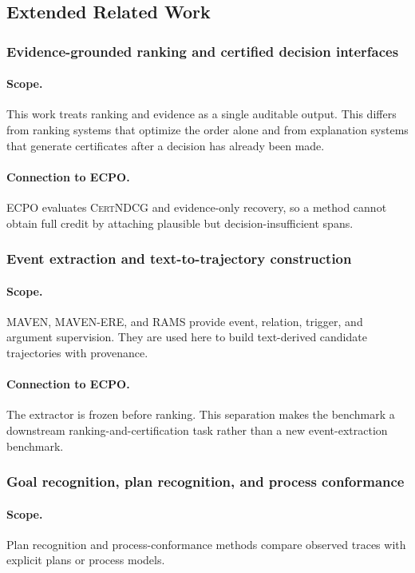 \documentclass{article}
\newcommand{\CertNDCG}{\textsc{CertNDCG}}
\begin{document}
\subsection{Extended Related Work}
\label{sec:app_related_work}

\subsubsection{Evidence-grounded ranking and certified decision interfaces}
\paragraph{Scope.}
This work treats ranking and evidence as a single auditable output. This differs from ranking systems that optimize the order alone and from explanation systems that generate certificates after a decision has already been made.
\paragraph{Connection to ECPO.}
ECPO evaluates \CertNDCG{} and evidence-only recovery, so a method cannot obtain full credit by attaching plausible but decision-insufficient spans.

\subsubsection{Event extraction and text-to-trajectory construction}
\paragraph{Scope.}
MAVEN, MAVEN-ERE, and RAMS provide event, relation, trigger, and argument supervision. They are used here to build text-derived candidate trajectories with provenance.
\paragraph{Connection to ECPO.}
The extractor is frozen before ranking. This separation makes the benchmark a downstream ranking-and-certification task rather than a new event-extraction benchmark.

\subsubsection{Goal recognition, plan recognition, and process conformance}
\paragraph{Scope.}
Plan recognition and process-conformance methods compare observed traces with explicit plans or process models.
\end{document}
